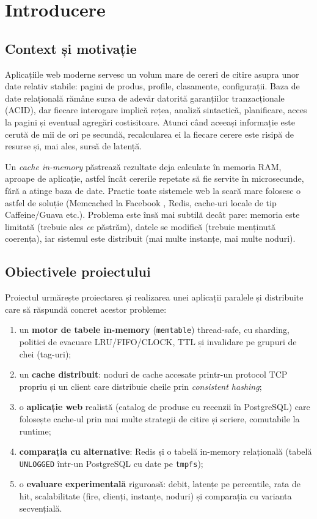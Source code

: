 \chapter{Introducere}
\label{ch:intro}

\section{Context și motivație}

Aplicațiile web moderne servesc un volum mare de cereri de citire asupra unor date relativ
stabile: pagini de produs, profile, clasamente, configurații. Baza de date relațională rămâne sursa
de adevăr datorită garanțiilor tranzacționale (ACID), dar fiecare interogare implică rețea,
analiză sintactică, planificare, acces la pagini și eventual agregări costisitoare. Atunci când
aceeași informație este cerută de mii de ori pe secundă, recalcularea ei la fiecare cerere este
risipă de resurse și, mai ales, sursă de latență.

Un \emph{cache in-memory} păstrează rezultate deja calculate în memoria RAM, aproape de aplicație,
astfel încât cererile repetate să fie servite în microsecunde, fără a atinge baza de date. Practic
toate sistemele web la scară mare folosesc o astfel de soluție (Memcached la Facebook
\cite{memcache-fb}, Redis, cache-uri locale de tip Caffeine/Guava etc.). Problema este însă mai
subtilă decât pare: memoria este limitată (trebuie ales \emph{ce} păstrăm), datele se modifică
(trebuie menținută coerența), iar sistemul este distribuit (mai multe instanțe, mai multe noduri).

\section{Obiectivele proiectului}

Proiectul urmărește proiectarea și realizarea unei aplicații paralele și distribuite care să răspundă
concret acestor probleme:

\begin{enumerate}
  \item un \textbf{motor de tabele in-memory} (\texttt{memtable}) thread-safe, cu sharding, politici de
        evacuare LRU/FIFO/CLOCK, TTL și invalidare pe grupuri de chei (tag-uri);
  \item un \textbf{cache distribuit}: noduri de cache accesate printr-un protocol TCP propriu și un client
        care distribuie cheile prin \emph{consistent hashing};
  \item o \textbf{aplicație web} realistă (catalog de produse cu recenzii în PostgreSQL) care folosește
        cache-ul prin mai multe strategii de citire și scriere, comutabile la runtime;
  \item \textbf{comparația cu alternative}: Redis și o tabelă in-memory relațională (tabelă
        \texttt{UNLOGGED} într-un PostgreSQL cu date pe \texttt{tmpfs});
  \item o \textbf{evaluare experimentală} riguroasă: debit, latențe pe percentile, rata de hit,
        scalabilitate (fire, clienți, instanțe, noduri) și comparația cu varianta secvențială.
\end{enumerate}

